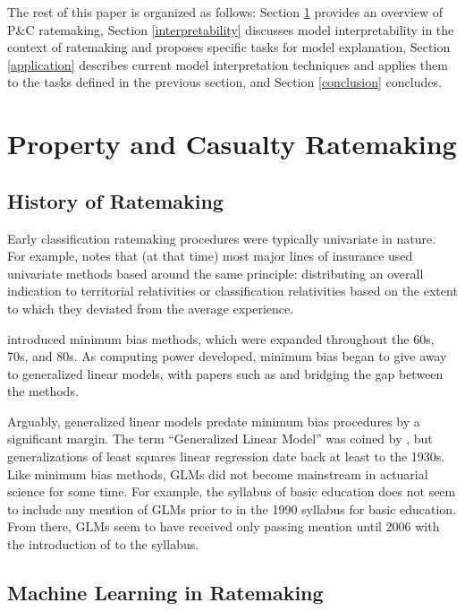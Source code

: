 \documentclass[]{interact}
\theoremstyle{plain}%
\theoremstyle{definition}
\theoremstyle{remark}
\begin{document}
The rest of this paper is organized as follows: Section \ref{ratemaking}
provides an overview of P\&C ratemaking, Section \ref{interpretability}
discusses model interpretability in the context of ratemaking and
proposes specific tasks for model explanation, Section \ref{application}
describes current model interpretation techniques and applies them to
the tasks defined in the previous section, and Section \ref{conclusion}
concludes.

\section{Property and Casualty Ratemaking}\label{ratemaking}

\subsection{History of Ratemaking}\label{history-of-ratemaking}

Early classification ratemaking procedures were typically univariate in
nature. For example, \citep{lange_1966} notes that (at that time) most
major lines of insurance used univariate methods based around the same
principle: distributing an overall indication to territorial
relativities or classification relativities based on the extent to which
they deviated from the average experience.

\citep{bailey_simon_1960} introduced minimum bias methods, which were
expanded throughout the 60s, 70s, and 80s. As computing power developed,
minimum bias began to give away to generalized linear models, with
papers such as \citep{brown_1988} and \citep{mildenhall_1999} bridging
the gap between the methods.

Arguably, generalized linear models predate minimum bias procedures by a
significant margin. The term ``Generalized Linear Model'' was coined by
\citep{nelder_wedderburn_1972}, but generalizations of least squares
linear regression date back at least to the 1930s. Like minimum bias
methods, GLMs did not become mainstream in actuarial science for some
time. For example, the syllabus of basic education does not seem to
include any mention of GLMs prior to \citep{brown_1988} in the 1990
syllabus for basic education. From there, GLMs seem to have received
only passing mention until 2006 with the introduction of
\citep{anderson_2005} to the syllabus.

\subsection{Machine Learning in
Ratemaking}\label{machine-learning-in-ratemaking}
\end{document}
